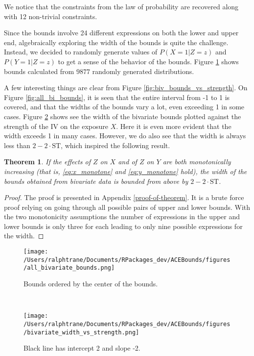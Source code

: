 \documentclass[
]{article}
\theoremstyle{plain}
\newtheorem{theorem}{Theorem}[section]
\begin{document}
We notice that the constraints from the law of probability are recovered along with 12 non-trivial constraints.

Since the bounds involve 24 different expressions on both the lower and upper end, algebraically exploring the width of the bounds is quite the challenge. Instead, we decided to randomly generate values of \(P(X = 1 | Z = z)\) and \(P(Y = 1 | Z = z)\) to get a sense of the behavior of the bounds. Figure \ref{fig:all_biv_bounds} shows bounds calculated from \(9877\) randomly generated distributions.

A few interesting things are clear from Figure \ref{fig:biv_bounds_vs_strength}. On Figure \ref{fig:all_bi_bounds}, it is seen that the entire interval from -1 to 1 is covered, and that the widths of the bounds vary a lot, even exceeding 1 in some cases. Figure \ref{fig:biv_width_vs_strength} shows see the width of the bivariate bounds plotted against the strength of the IV on the exposure \(X\). Here it is even more evident that the width exceeds 1 in many cases. However, we do also see that the width is always less than \(2 - 2\cdot \text{ST}\), which inspired the following result.

\begin{theorem}\label{thm:upperBoundWidth}
If the effects of $Z$ on $X$ and of $Z$ on $Y$ are both monotonically increasing (that is, \eqref{eq:x_monotone} and \eqref{eq:y_monotone} hold), the width of the bounds obtained from bivariate data is bounded from above by $2 - 2\cdot \text{ST}$. 
\end{theorem}

\begin{proof}
The proof is presented in Appendix \ref{proof-of-theorem}. It is a brute force proof relying on going through all possible pairs of upper and lower bounds. With the two monotonicity assumptions the number of expressions in the upper and lower bounds is only three for each leading to only nine possible expressions for the width. 
\end{proof}

\begin{figure*}[h]
  \centering
  \begin{subfigure}[t]{0.5\textwidth}
    \centering
    \texttt{[image: /Users/ralphtrane/Documents/RPackages\_dev/ACEBounds/figures/all\_bivariate\_bounds.png]}
    \caption{Bounds ordered by the center of the bounds.}
    \label{fig:all_biv_bounds}
  \end{subfigure}%
  ~
  \begin{subfigure}[t]{0.5\textwidth}
    \texttt{[image: /Users/ralphtrane/Documents/RPackages\_dev/ACEBounds/figures/bivariate\_width\_vs\_strength.png]}
    \caption{Black line has intercept 2 and slope -2.}
    \label{fig:biv_width_vs_strength}
  \end{subfigure}
  \caption{Note: Of the 10,000 generated distributions, 123 resulted in bounds where the lower bound was greater than the upper bounds. These have been removed from these plots.}
  \label{fig:biv_bounds_vs_strength}
\end{figure*}
\end{document}
